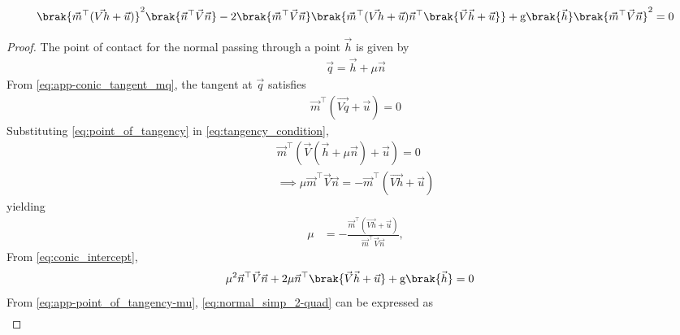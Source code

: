 \begin{enumerate}[label=\thesubsection.\arabic*.,ref=\thesubsection.\theenumi]
\begin{equation}
	\label{eq:app-point_of_tangency-m}
	\brak{ {\vec{m}^\top(\vec{Vh}+\vec{u})}}^2\brak{\vec{n}^{\top}\vec{V}\vec{n}} 
	- 2\brak{\vec{m}^\top\vec{V}\vec{n}} \brak{ {\vec{m}^\top(\vec{Vh}+\vec{u})}\vec{n}^{\top}\brak{\vec{V}\vec{h}+\vec{u}}} 
+  \text{g}\brak{
  \vec{h}
	  }\brak{\vec{m}^\top\vec{V}\vec{n}}^2
	= 0
\end{equation}
\begin{proof}
The point of contact for the normal passing through a point $\vec{h}$ is given by 
\begin{align}
	\label{eq:point_of_tangency}
	\vec{q} = \vec{h} + \mu\vec{n}
\end{align}
From 
  \eqref{eq:app-conic_tangent_mq},
	the tangent at $\vec{q}$ satisfies 
\begin{align}
	\label{eq:tangency_condition}
	\vec{m}^\top(\vec{Vq}+\vec{u}) = 0
\end{align}
Substituting \eqref{eq:point_of_tangency} in \eqref{eq:tangency_condition},
\begin{align}
	\label{eq:normal_simp_1}
	\vec{m}^\top(\vec{V}(\vec{h}+\mu\vec{n})+\vec{u}) = 0\\
	\label{eq:normal_simp_2}
	\implies \mu\vec{m}^\top\vec{V}\vec{n} = -\vec{m}^\top(\vec{Vh}+\vec{u})
\end{align}
yielding 
\begin{align}
	\label{eq:app-point_of_tangency-mu}
	\mu &=- \frac  {\vec{m}^\top(\vec{Vh}+\vec{u})}{\vec{m}^\top\vec{V}\vec{n}},
\end{align}
	From 
\eqref{eq:conic_intercept},
\begin{align}
	\label{eq:normal_simp_2-quad}
\mu^2\vec{n}^{\top}\vec{V}\vec{n} + 2 \mu\vec{n}^{\top}\brak{\vec{V}\vec{h}+\vec{u}} 
+  \text{g}\brak{
  \vec{h}
	  }
	&= 0
\end{align}
From 
	\eqref{eq:app-point_of_tangency-mu},
	\eqref{eq:normal_simp_2-quad} can be expressed
	as
\begin{multline}

\end{multline}
\end{proof}
\end{enumerate}
